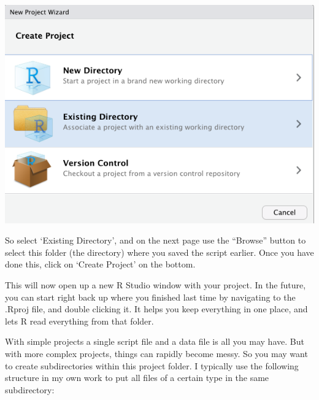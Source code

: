 \documentclass[
]{book}
\begin{document}
\includegraphics{img/existing_dir.png}

So select `Existing Directory', and on the next page use the ``Browse'' button to select this folder (the directory) where you saved the script earlier. Once you have done this, click on `Create Project' on the bottom.

This will now open up a new R Studio window with your project. In the future, you can start right back up where you finished last time by navigating to the .Rproj file, and double clicking it. It helps you keep everything in one place, and lets R read everything from that folder.

With simple projects a single script file and a data file is all you may have. But with more complex projects, things can rapidly become messy. So you may want to create subdirectories within this project folder. I typically use the following structure in my own work to put all files of a certain type in the same subdirectory:
\end{document}
